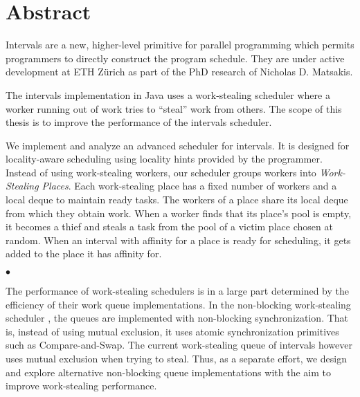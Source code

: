 
\chapter*{Abstract}
\label{chap:abstract}

Intervals are a new, higher-level primitive for parallel programming
which permits programmers to directly construct the program
schedule. They are under active development at ETH Zürich as part of
the PhD research of Nicholas D. Matsakis.

The intervals implementation in Java uses a work-stealing scheduler
where a worker running out of work tries to ``steal'' work from
others. The scope of this thesis is to improve the performance of the
intervals scheduler.

We implement and analyze an advanced scheduler for intervals. It is
designed for locality-aware scheduling using locality hints provided
by the programmer. Instead of using work-stealing workers, our
scheduler groups workers into \emph{Work-Stealing Places}.  Each
work-stealing place has a fixed number of workers and a local deque to
maintain ready tasks. The workers of a place share its local deque
from which they obtain work. When a worker finds that its place's pool
is empty, it becomes a thief and steals a task from the pool of a
victim place chosen at random. When an interval with affinity for a
place is ready for scheduling, it gets added to the place it has
affinity for.

\begin{center}
  $\bullet$
\end{center}

The performance of work-stealing schedulers is in a large part
determined by the efficiency of their work queue implementations. In
the non-blocking work-stealing scheduler \cite{Arora2001}, the queues
are implemented with non-blocking synchronization. That is, instead of
using mutual exclusion, it uses atomic synchronization primitives such
as Compare-and-Swap. The current work-stealing queue of intervals
however uses mutual exclusion when trying to steal. Thus, as a
separate effort, we design and explore alternative non-blocking queue
implementations with the aim to improve work-stealing performance.


